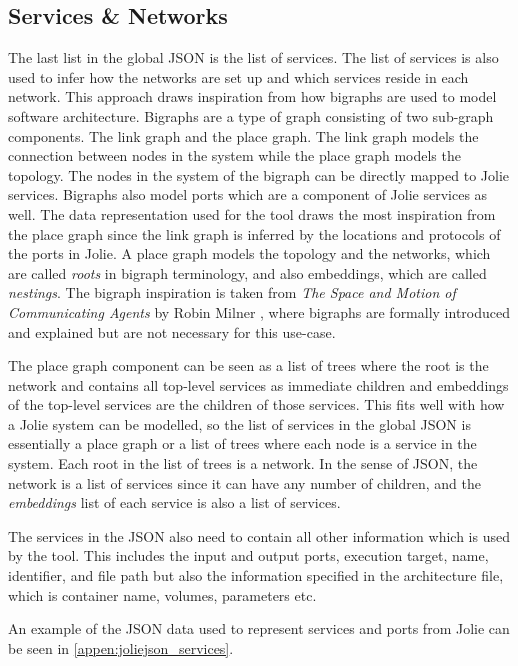 \subsection{Services \& Networks}
The last list in the global JSON is the list of services. The list of services is also used to infer how the networks are set up and which services reside in each network.
This approach draws inspiration from how bigraphs are used to model software architecture. Bigraphs are a type of graph consisting of two sub-graph components. The link graph and the place graph. The link graph models the connection between nodes in the system while the place graph models the topology.
The nodes in the system of the bigraph can be directly mapped to Jolie services. Bigraphs also model ports which are a component of Jolie services as well.
The data representation used for the tool draws the most inspiration from the place graph since the link graph is inferred by the locations and protocols of the ports in Jolie.
A place graph models the topology and the networks, which are called \textit{roots} in bigraph terminology, and also embeddings, which are called \textit{nestings}.
The bigraph inspiration is taken from \textit{The Space and Motion of Communicating Agents} by Robin Milner \cite{BigraphBook}, where bigraphs are formally introduced and explained but are not necessary for this use-case.

The place graph component can be seen as a list of trees where the root is the network and contains all top-level services as immediate children and embeddings of the top-level services are the children of those services.
This fits well with how a Jolie system can be modelled, so the list of services in the global JSON is essentially a place graph or a list of trees where each node is a service in the system.
Each root in the list of trees is a network. In the sense of JSON, the network is a list of services since it can have any number of children, and the \textit{embeddings} list of each service is also a list of services.

The services in the JSON also need to contain all other information which is used by the tool.
This includes the input and output ports, execution target, name, identifier, and file path but also the information specified in the architecture file, which is container name, volumes, parameters etc.

An example of the JSON data used to represent services and ports from Jolie can be seen in \cref{appen:joliejson_services}.

